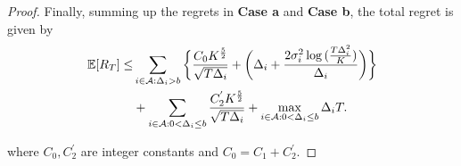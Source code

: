 \begin{proof}
Finally, summing up the regrets in \textbf{Case a} and \textbf{Case b}, the total regret is given by
\begin{align*}
\mathbb{E} [R_{T}] \leq &\sum\limits_{i\in \mathcal{A} :\Delta_{i} > b}\bigg\lbrace \dfrac{C_0 K^{\frac{5}{2}}}{\sqrt{T\Delta_i}} + \bigg(\Delta_{i}+\dfrac{2\sigma_i^2\log{(\frac{T\Delta_{i}^{2}}{K})}}{\Delta_{i}}\bigg)\bigg \rbrace\\ 
  & +\sum\limits_{i\in \mathcal{A} :0 < \Delta_{i}\leq b} \dfrac{C_2^{'} K^{\frac{5}{2}}}{\sqrt{T\Delta_i}} + \max_{i\in \mathcal{A} :0 < \Delta_{i}\leq b}\Delta_{i}T.
\end{align*}

where $C_0, C_2^{'}$ are integer constants and $C_0=C_1 + C_2^{'}$.
\end{proof}


